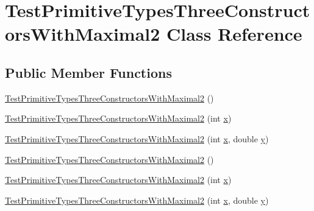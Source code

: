\hypertarget{classTestPrimitiveTypesThreeConstructorsWithMaximal2}{
\section{TestPrimitiveTypesThreeConstructorsWithMaximal2 Class Reference}
\label{classTestPrimitiveTypesThreeConstructorsWithMaximal2}
}
\subsection*{Public Member Functions}
\begin{DoxyCompactItemize}
\item 
\hyperlink{classTestPrimitiveTypesThreeConstructorsWithMaximal2_a7148bf6cc4c18b41c0c9ec2aa37d541a}{TestPrimitiveTypesThreeConstructorsWithMaximal2} ()
\item 
\hyperlink{classTestPrimitiveTypesThreeConstructorsWithMaximal2_ad443cc6dc73ab54028a299a6f3dcae15}{TestPrimitiveTypesThreeConstructorsWithMaximal2} (int \hyperlink{classTestPrimitiveTypesThreeConstructorsWithMaximal2_a33629372829a82f695df1283b2cee95b}{x})
\item 
\hyperlink{classTestPrimitiveTypesThreeConstructorsWithMaximal2_a183ee304b112b1b55709a0d017afa06b}{TestPrimitiveTypesThreeConstructorsWithMaximal2} (int \hyperlink{classTestPrimitiveTypesThreeConstructorsWithMaximal2_a33629372829a82f695df1283b2cee95b}{x}, double \hyperlink{classTestPrimitiveTypesThreeConstructorsWithMaximal2_a765424ea939b63074c63d56aa0371d00}{y})
\item 
\hyperlink{classTestPrimitiveTypesThreeConstructorsWithMaximal2_a7148bf6cc4c18b41c0c9ec2aa37d541a}{TestPrimitiveTypesThreeConstructorsWithMaximal2} ()
\item 
\hyperlink{classTestPrimitiveTypesThreeConstructorsWithMaximal2_ad443cc6dc73ab54028a299a6f3dcae15}{TestPrimitiveTypesThreeConstructorsWithMaximal2} (int \hyperlink{classTestPrimitiveTypesThreeConstructorsWithMaximal2_a33629372829a82f695df1283b2cee95b}{x})
\item 
\hyperlink{classTestPrimitiveTypesThreeConstructorsWithMaximal2_a183ee304b112b1b55709a0d017afa06b}{TestPrimitiveTypesThreeConstructorsWithMaximal2} (int \hyperlink{classTestPrimitiveTypesThreeConstructorsWithMaximal2_a33629372829a82f695df1283b2cee95b}{x}, double \hyperlink{classTestPrimitiveTypesThreeConstructorsWithMaximal2_a765424ea939b63074c63d56aa0371d00}{y})
\end{DoxyCompactItemize}
